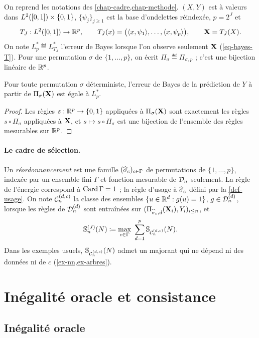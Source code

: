 On reprend les notations des \cref{chap-cadre,chap-methode}. $(X,Y)$ est à valeurs dans $L^2([0,1])\times\{0,1\}$, $\{\psi_j\}_{j\ge1}$ est la base d'ondelettes réindexée, $p=2^J$ et
\[
  T_J:L^2([0,1])\to\mathbb{R}^p,\qquad T_J(x)=\bigl(\langle x,\psi_1\rangle,\dots,\langle x,\psi_p\rangle\bigr),\qquad \mathbf{X}=T_J(X).
\]
On note $L^*_p\eqdef L^*_{T_J}$ l'erreur de Bayes lorsque l'on observe seulement $\mathbf{X}$ (\cref{eq-bayes-T}). Pour une permutation $\sigma$ de $\{1,\dots,p\}$, on écrit $\Pi_\sigma\eqdef\Pi_{\sigma,p}$ ; c'est une bijection linéaire de $\mathbb{R}^p$.

\begin{lemme}\label{lem-bayes-permutation}
Pour toute permutation $\sigma$ déterministe, l'erreur de Bayes de la prédiction de $Y$ à partir de $\Pi_\sigma(\mathbf{X})$ est égale à $L^*_p$.
\end{lemme}

\begin{proof}
Les règles $s:\mathbb{R}^p\to\{0,1\}$ appliquées à $\Pi_\sigma(\mathbf{X})$ sont exactement les règles $s\circ\Pi_\sigma$ appliquées à $\mathbf{X}$, et $s\mapsto s\circ\Pi_\sigma$ est une bijection de l'ensemble des règles mesurables sur $\mathbb{R}^p$.
\end{proof}

\paragraph{Le cadre de sélection.} Un \emph{réordonnancement} est une famille $(\widehat{\sigma}_c)_{c\in\Gamma}$ de permutations de $\{1,\dots,p\}$, indexée par un ensemble fini $\Gamma$ et fonction mesurable de $\mathcal{D}_n$ seulement. La règle de l'énergie correspond à $\operatorname{Card}\Gamma=1$ ; la règle d'usage à $\widehat{\sigma}_c$ défini par la \cref{def-usage}. On note $\mathcal{C}_n^{(d,c)}$ la classe des ensembles $\{u\in\mathbb{R}^d:g(u)=1\}$, $g\in\mathcal{D}_n^{(d)}$, lorsque les règles de $\mathcal{D}_n^{(d)}$ sont entraînées sur $(\Pi_{\widehat{\sigma}_c,d}(\mathbf{X}_i),Y_i)_{i\le n}$, et
\[
  \Sh^{(J)}_n(N)\eqdef\max_{c\in\Gamma}\ \sum_{d=1}^p\Sh_{\cC_n^{(d,c)}}(N).
\]
Dans les exemples usuels, $\mathbb{S}_{\mathcal{C}_n^{(d,c)}}(N)$ admet un majorant qui ne dépend ni des données ni de $c$ (\cref{ex-nn,ex-arbres}).

\section{Inégalité oracle et consistance}\label{sec-reproduction}

\subsection{Inégalité oracle}

